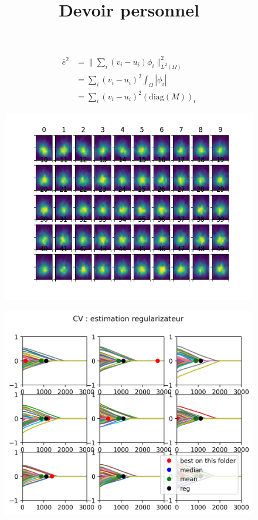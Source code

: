 \documentclass{article}
\date{}
\date{}
\title{Devoir personnel}
\begin{document}
\maketitle
\section{}%
\begin{equation}
\begin{aligned}
\bar{e}^2 &= \|\sum_i (v_i-u_i)\phi_i\|_{L^2(\Omega)}^2\\
&= \sum_i(v_i-u_i)^2 \int_{\Omega}|\phi_i|\\
&= \sum_i (v_i - u_i )^2 (\text{diag}(M))_i
\end{aligned}
\end{equation}
\begin{figure}
\includegraphics[scale=1]{visu_feature.png}
\end{figure}

\newpage
\begin{figure}
\includegraphics[scale=1]{cv_reg.png}
\end{figure}
\end{document}
